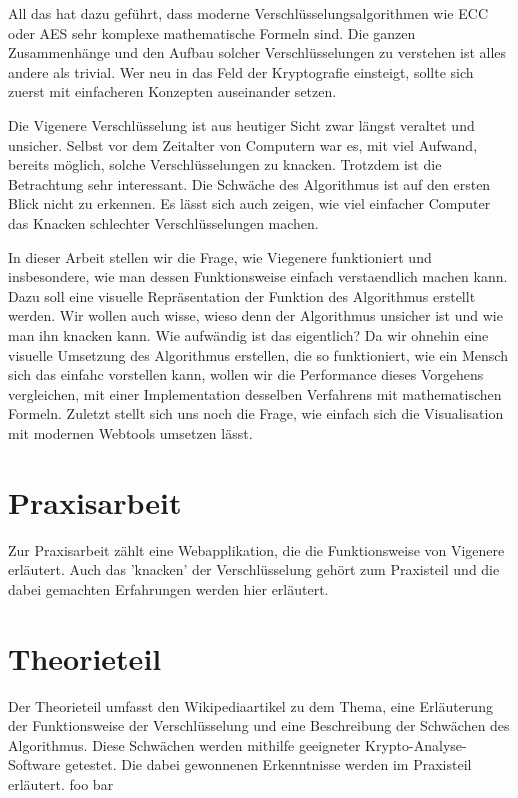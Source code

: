 \documentclass[11pt,paper=a4,final]{scrartcl}
\begin{document}
All das hat dazu gef\"uhrt, dass moderne Verschl\"usselungsalgorithmen wie ECC oder AES sehr komplexe mathematische Formeln sind. Die ganzen Zusammenh\"ange und den Aufbau solcher Verschl\"usselungen zu verstehen ist alles andere als trivial. Wer neu in das Feld der Kryptografie einsteigt, sollte sich zuerst mit einfacheren Konzepten auseinander setzen.

Die Vigenere Verschl\"usselung ist aus heutiger Sicht zwar l\"angst veraltet und unsicher. Selbst vor dem Zeitalter von Computern war es, mit viel Aufwand, bereits m\"oglich, solche Verschl\"usselungen zu knacken. Trotzdem ist die Betrachtung sehr interessant. Die Schw\"ache des Algorithmus ist auf den ersten Blick nicht zu erkennen. Es l\"asst sich auch zeigen, wie viel einfacher Computer das Knacken schlechter Verschl\"usselungen machen.

In dieser Arbeit stellen wir die Frage, wie Viegenere funktioniert und insbesondere, wie man dessen Funktionsweise einfach verstaendlich machen kann. Dazu soll eine visuelle Repr\"asentation der Funktion des Algorithmus erstellt werden. Wir wollen auch wisse, wieso denn der Algorithmus unsicher ist und wie man ihn knacken kann. Wie aufw\"andig ist das eigentlich? Da wir ohnehin eine visuelle Umsetzung des Algorithmus erstellen, die so funktioniert, wie ein Mensch sich das einfahc vorstellen kann, wollen wir die Performance dieses Vorgehens vergleichen, mit einer Implementation desselben Verfahrens mit mathematischen Formeln. Zuletzt stellt sich uns noch die Frage, wie einfach sich die Visualisation mit modernen Webtools umsetzen l\"asst.
\section{Praxisarbeit}
Zur Praxisarbeit z\"ahlt eine Webapplikation, die die Funktionsweise von Vigenere erl\"autert. Auch das 'knacken' der Verschl\"usselung geh\"ort zum Praxisteil und die dabei gemachten Erfahrungen werden hier erl\"autert.
\section{Theorieteil}
Der Theorieteil umfasst den Wikipediaartikel zu dem Thema, eine Erl\"auterung der Funktionsweise der Verschl\"usselung und eine Beschreibung der Schw\"achen des Algorithmus. Diese Schw\"achen werden mithilfe geeigneter Krypto-Analyse-Software getestet. Die dabei gewonnenen Erkenntnisse werden im Praxisteil erl\"autert.
\newpage
foo bar
{}

\end{document}
